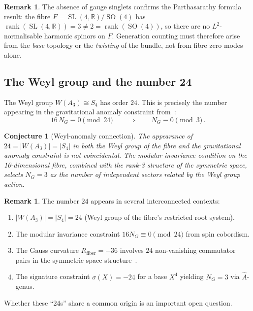 \documentclass[12pt,a4paper]{article}
\newtheorem{conjecture}[theorem]{Conjecture}
\theoremstyle{definition}
\newtheorem{remark}[theorem]{Remark}
\newcommand{\SO}{\operatorname{SO}}
\newcommand{\SL}{\operatorname{SL}}
\newcommand{\R}{\mathbb{R}}
\begin{document}
\begin{remark}
The absence of gauge singlets confirms the Parthasarathy formula result: the fibre $F = \SL(4,\R)/\SO(4)$ has $\operatorname{rank}(\SL(4,\R)) = 3 \neq 2 = \operatorname{rank}(\SO(4))$, so there are no $L^2$-normalisable harmonic spinors on $F$.
Generation counting must therefore arise from the \emph{base} topology or the \emph{twisting} of the bundle, not from fibre zero modes alone.
\end{remark}

\subsection{The Weyl group and the number 24}

The Weyl group $W(A_3) \cong S_4$ has order $24$.
This is precisely the number appearing in the gravitational anomaly constraint from~\cite{Paper4}:
\begin{equation}
16 \, N_G \equiv 0 \pmod{24} \qquad \Longrightarrow \qquad N_G \equiv 0 \pmod{3}\,.
\end{equation}

\begin{conjecture}[Weyl-anomaly connection]
\label{conj:weyl_anomaly}
The appearance of $24 = |W(A_3)| = |S_4|$ in both the Weyl group of the fibre and the gravitational anomaly constraint is not coincidental.
The modular invariance condition on the 10-dimensional fibre, combined with the rank-3 structure of the symmetric space, selects $N_G = 3$ as the number of independent sectors related by the Weyl group action.
\end{conjecture}

\begin{remark}
The number $24$ appears in several interconnected contexts:
\begin{enumerate}[nosep]
\item $|W(A_3)| = |S_4| = 24$ (Weyl group of the fibre's restricted root system).
\item The modular invariance constraint $16 N_G \equiv 0 \pmod{24}$ from spin cobordism.
\item The Gauss curvature $R_{\text{fiber}} = -36$ involves $24$ non-vanishing commutator pairs in the symmetric space structure~\cite{Paper3}.
\item The signature constraint $\sigma(X) = -24$ for a base $X^4$ yielding $N_G = 3$ via $\hat{A}$-genus.
\end{enumerate}
Whether these ``24s'' share a common origin is an important open question.
\end{remark}
\end{document}

